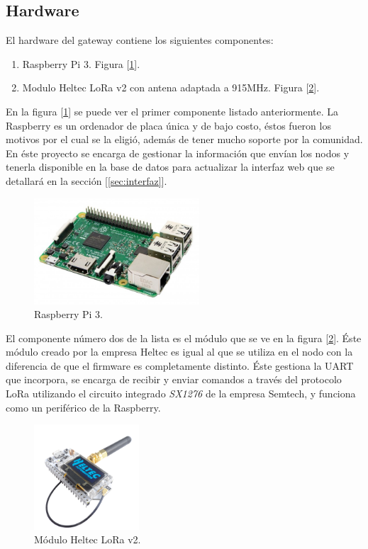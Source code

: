 \subsection{Hardware}

El hardware del gateway contiene los siguientes componentes:

\begin{enumerate}
\item Raspberry Pi 3. Figura [\ref{fig:raspberry}].
\item Modulo Heltec LoRa v2 con antena adaptada a 915MHz. Figura [\ref{fig:helteclora}].
\end{enumerate}

En la figura [\ref{fig:raspberry}] se puede ver el primer componente listado anteriormente. La Raspberry es un ordenador de placa única y de bajo costo, éstos fueron los motivos por el cual se la eligió, además de tener mucho soporte por la comunidad.
En éste proyecto se encarga de gestionar la información que envían los nodos y tenerla disponible en la base de datos para actualizar la interfaz web que se detallará en la sección [\ref{sec:interfaz}].

\begin{figure}[h!]
	\centering
	\includegraphics[width=0.55\textwidth]{./Figures/raspberry.jpg}
	\caption{Raspberry Pi 3.}
	\label{fig:raspberry}
\end{figure}

El componente número dos de la lista es el módulo que se ve en la figura [\ref{fig:helteclora}]. Éste módulo creado por la empresa Heltec es igual al que se utiliza en el nodo con la diferencia de que el firmware es completamente distinto. Éste gestiona la UART que incorpora, se encarga de recibir y enviar comandos a través del protocolo LoRa utilizando el circuito integrado {\textit{SX1276}} de la empresa Semtech, y funciona como un periférico de la Raspberry.

\begin{figure}[h!]
	\centering
	\includegraphics[width=0.35\textwidth]{./Figures/helteclora.png}
	\caption{Módulo Heltec LoRa v2.}
	\label{fig:helteclora}
\end{figure}

